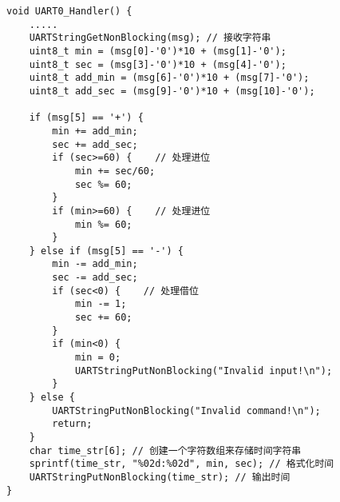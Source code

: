 \documentclass[12pt, a4paper, oneside]{ctexart}
\begin{document}
\begin{enumerate}[listparindent=2em]
    \begin{lstlisting}
void UART0_Handler() {
    .....
    UARTStringGetNonBlocking(msg); // 接收字符串
    uint8_t min = (msg[0]-'0')*10 + (msg[1]-'0');
    uint8_t sec = (msg[3]-'0')*10 + (msg[4]-'0');
    uint8_t add_min = (msg[6]-'0')*10 + (msg[7]-'0');
    uint8_t add_sec = (msg[9]-'0')*10 + (msg[10]-'0');

    if (msg[5] == '+') {
        min += add_min;
        sec += add_sec;
        if (sec>=60) {    // 处理进位
            min += sec/60;
            sec %= 60;
        }
        if (min>=60) {    // 处理进位
            min %= 60;
        }
    } else if (msg[5] == '-') {
        min -= add_min;
        sec -= add_sec;
        if (sec<0) {    // 处理借位
            min -= 1;
            sec += 60;
        }
        if (min<0) {    
            min = 0;
            UARTStringPutNonBlocking("Invalid input!\n");
        }
    } else {
        UARTStringPutNonBlocking("Invalid command!\n");
        return;
    }
    char time_str[6]; // 创建一个字符数组来存储时间字符串
    sprintf(time_str, "%02d:%02d", min, sec); // 格式化时间
    UARTStringPutNonBlocking(time_str); // 输出时间 
}
    \end{lstlisting}
        


\end{enumerate}
        
\end{document}
